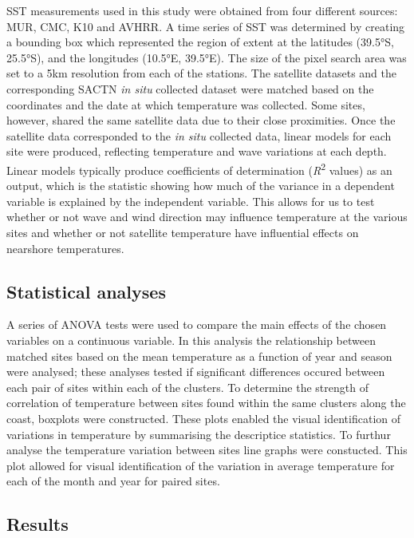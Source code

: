 \documentclass[10pt,a4paper,]{article}
\begin{document}
SST measurements used in this study were obtained from four different
sources: MUR, CMC, K10 and AVHRR. A time series of SST was determined by
creating a bounding box which represented the region of extent at the
latitudes (39.5°S, 25.5°S), and the longitudes (10.5°E, 39.5°E). The
size of the pixel search area was set to a 5km resolution from each of
the stations. The satellite datasets and the corresponding SACTN
\emph{in situ} collected dataset were matched based on the coordinates
and the date at which temperature was collected. Some sites, however,
shared the same satellite data due to their close proximities. Once the
satellite data corresponded to the \emph{in situ} collected data, linear
models for each site were produced, reflecting temperature and wave
variations at each depth. Linear models typically produce coefficients
of determination (\emph{R}\textsuperscript{2} values) as an output,
which is the statistic showing how much of the variance in a dependent
variable is explained by the independent variable. This allows for us to
test whether or not wave and wind direction may influence temperature at
the various sites and whether or not satellite temperature have
influential effects on nearshore temperatures.

\hypertarget{statistical-analyses}{%
\subsection{Statistical analyses}\label{statistical-analyses}}

A series of ANOVA tests were used to compare the main effects of the
chosen variables on a continuous variable. In this analysis the
relationship between matched sites based on the mean temperature as a
function of year and season were analysed; these analyses tested if
significant differences occured between each pair of sites within each
of the clusters. To determine the strength of correlation of temperature
between sites found within the same clusters along the coast, boxplots
were constructed. These plots enabled the visual identification of
variations in temperature by summarising the descriptice statistics. To
furthur analyse the temperature variation between sites line graphs were
constucted. This plot allowed for visual identification of the variation
in average temperature for each of the month and year for paired sites.

\hypertarget{results}{%
\subsection{Results}\label{results}}
\end{document}
